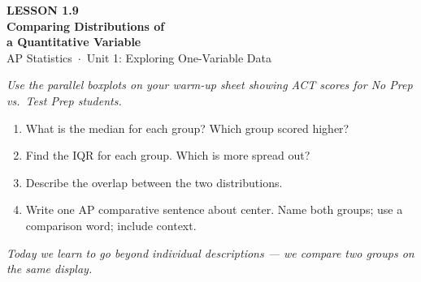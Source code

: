 \documentclass[aspectratio=169, 11pt]{beamer}
\begin{document}
{
\begin{frame}[plain]
  \vspace{2.8cm}
  \hspace{0.55cm}%
  \begin{minipage}{0.9\textwidth}
    {\color{goldacc}\bfseries\small LESSON 1.9}\\[0.5cm]
    {\color{white}\bfseries\LARGE Comparing Distributions of\\[0.25cm]
      a Quantitative Variable}\\[1.4cm]
    {\color{skymid}\small AP Statistics~$\cdot$~Unit 1: Exploring One-Variable Data}
  \end{minipage}
\end{frame}
}

{
\begin{frame}[t, plain]
  \vspace{1em}%
  \hspace{0.55cm}%
  \begin{minipage}{0.9\textwidth}
    \small
    \textit{Use the parallel boxplots on your warm-up sheet showing ACT scores
    for No Prep vs.\ Test Prep students.}

    \vspace{0.5em}
    \begin{enumerate}
      \setlength{\itemsep}{0.6em}\setlength{\topsep}{0em}
      \item What is the median for each group? Which group scored higher?
      \item Find the IQR for each group. Which is more spread out?
      \item Describe the overlap between the two distributions.
      \item Write one AP comparative sentence about center.
            Name both groups; use a comparison word; include context.
    \end{enumerate}
    \vspace{0.4cm}
    {\color{navy}\itshape\small
      Today we learn to go beyond individual descriptions ---
      we compare two groups on the same display.}
  \end{minipage}
\end{frame}
}
\end{document}
